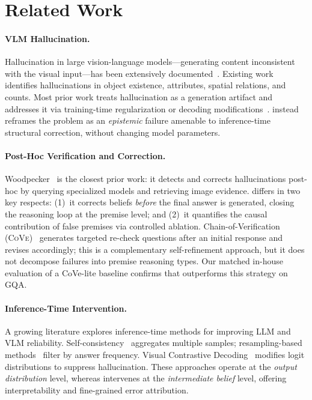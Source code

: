 \section{Related Work}
\label{sec:related}

\paragraph{VLM Hallucination.}
Hallucination in large vision-language models---generating content inconsistent with
the visual input---has been extensively documented~\cite{li2023evaluating,guan2024hallusionbench}.
Existing work identifies hallucinations in object existence, attributes, spatial
relations, and counts. Most prior work treats hallucination as a generation artifact
and addresses it via training-time regularization or decoding
modifications~\cite{leng2024mitigating,huang2024opera}.
\bci{} instead reframes the problem as an \emph{epistemic} failure amenable to
inference-time structural correction, without changing model parameters.

\paragraph{Post-Hoc Verification and Correction.}
Woodpecker~\cite{yin2023woodpecker} is the closest prior work: it detects and corrects
hallucinations post-hoc by querying specialized models and retrieving image evidence.
\bci{} differs in two key respects: (1)~it corrects beliefs \emph{before} the final
answer is generated, closing the reasoning loop at the premise level; and (2)~it
quantifies the causal contribution of false premises via controlled ablation.
Chain-of-Verification (\textsc{CoVe})~\cite{dhuliawala2024chain} generates targeted
re-check questions after an initial response and revises accordingly; this is a
complementary self-refinement approach, but it does not decompose failures into
premise \vs reasoning types. Our matched in-house evaluation of a CoVe-lite baseline
confirms that \bci{} outperforms this strategy on GQA.

\paragraph{Inference-Time Intervention.}
A growing literature explores inference-time methods for improving LLM and VLM
reliability. Self-consistency~\cite{wang2023self} aggregates multiple samples;
resampling-based methods~\cite{cobbe2021training} filter by answer frequency. Visual
Contrastive Decoding~\cite{leng2024mitigating} modifies logit distributions to
suppress hallucination. These approaches operate at the \emph{output distribution}
level, whereas \bci{} intervenes at the \emph{intermediate belief} level, offering
interpretability and fine-grained error attribution.

